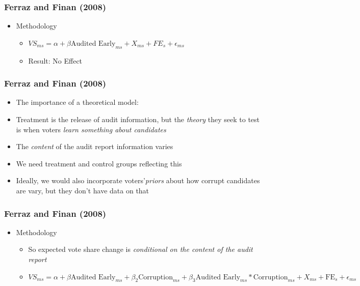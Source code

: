 \documentclass[xcolor=x11names,compress]{beamer}\usepackage[]{graphicx}\usepackage[]{color}
\renewcommand{\(}{\begin{columns}}
\renewcommand{\)}{\end{columns}}
\newcommand{\<}[1]{\begin{column}{#1}}
\renewcommand{\>}{\end{column}}
\begin{document}
\begin{frame}
\frametitle{Ferraz and Finan (2008)}
\begin{itemize}
\item Methodology
\begin{itemize}
\item $VS_{ms} = \alpha + \beta \text{Audited Early}_{ms} + X_{ms} + FE_{s} + \epsilon_{ms}$
\pause
\item Result: No Effect
\end{itemize}
\end{itemize}
\end{frame}

\begin{frame}
\frametitle{Ferraz and Finan (2008)}
\begin{itemize}
\item The importance of a theoretical model:
\pause
\item Treatment is the release of audit information, but the \textit{theory} they seek to test is when voters \textit{learn something about candidates}
\pause
\item The \textit{content} of the audit report information varies
\pause
\item We need treatment and control groups reflecting this
\pause
\item Ideally, we would also incorporate voters'\textit{priors} about how corrupt candidates are vary, but they don't have data on that
\end{itemize}
\end{frame}

\begin{frame}
\frametitle{Ferraz and Finan (2008)}
\begin{itemize}
\item Methodology
\begin{itemize}
\item So expected vote share change is \textit{conditional on the content of the audit report}
\pause
\item $VS_{ms} = \alpha + \beta \text{Audited Early}_{ms} + \beta_2 \text{Corruption}_{ms} + \beta_3 \text{Audited Early}_{ms}*\text{Corruption}_{ms} + X_{ms} + \text{FE}_{s} + \epsilon_{ms}$
\end{itemize}
\end{itemize}
\end{frame}
\end{document}
